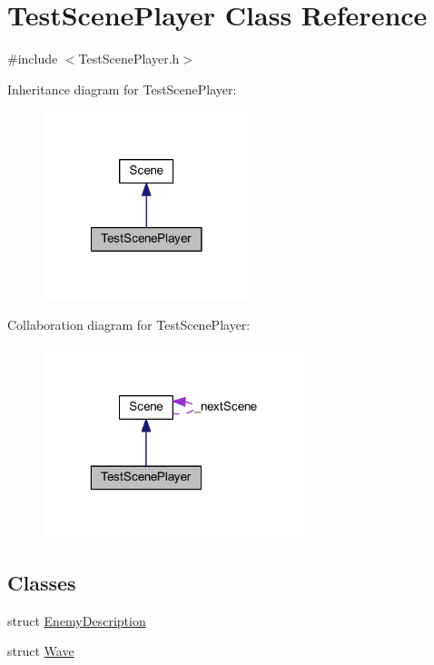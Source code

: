 \hypertarget{class_test_scene_player}{
\section{TestScenePlayer Class Reference}
\label{d1/d1a/class_test_scene_player}
}


{\ttfamily \#include $<$TestScenePlayer.h$>$}



Inheritance diagram for TestScenePlayer:
\nopagebreak
\begin{figure}[H]
\begin{center}
\leavevmode
\includegraphics[width=170pt]{d9/da9/class_test_scene_player__inherit__graph}
\end{center}
\end{figure}


Collaboration diagram for TestScenePlayer:
\nopagebreak
\begin{figure}[H]
\begin{center}
\leavevmode
\includegraphics[width=217pt]{df/db9/class_test_scene_player__coll__graph}
\end{center}
\end{figure}
\subsection*{Classes}
\begin{DoxyCompactItemize}
\item 
struct \hyperlink{struct_test_scene_player_1_1_enemy_description}{EnemyDescription}
\item 
struct \hyperlink{struct_test_scene_player_1_1_wave}{Wave}
\end{DoxyCompactItemize}
